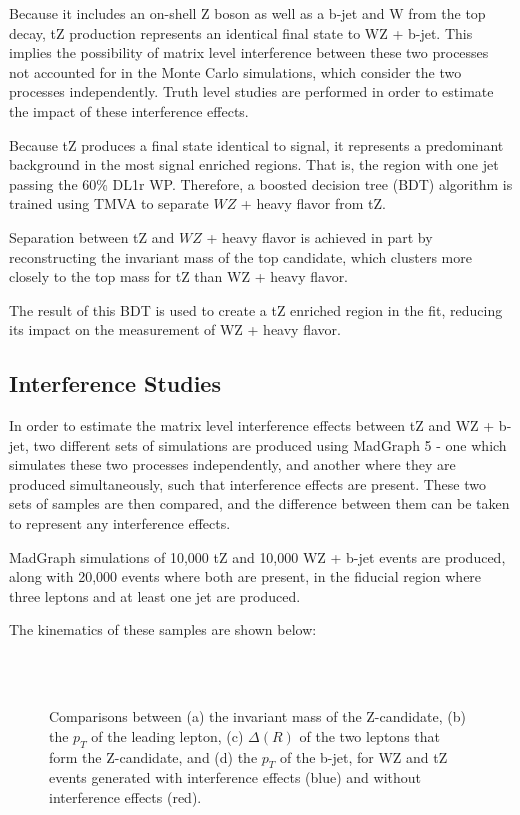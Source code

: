 
Because it includes an on-shell Z boson as well as a b-jet and W from the top decay, tZ production represents an identical final state  to WZ + b-jet. This implies the possibility of matrix level interference between these two processes not accounted for in the Monte Carlo simulations, which consider the two processes independently. Truth level studies are performed in order to estimate the impact of these interference effects.

Because tZ produces a final state identical to signal, it represents a predominant background in the most signal enriched regions. That is, the region with one jet passing the 60\% DL1r WP. Therefore, a boosted decision tree (BDT) algorithm is trained using TMVA \cite{TMVA_guide} to separate $WZ$ + heavy flavor from tZ.

Separation between tZ and $WZ$ + heavy flavor is achieved in part by reconstructing the invariant mass of the top candidate, which clusters more closely to the top mass for tZ than WZ + heavy flavor.

The result of this BDT is used to create a tZ enriched region in the fit, reducing its impact on the measurement of WZ + heavy flavor.

\subsection{Interference Studies}
\label{subsec:interference}

In order to estimate the matrix level interference effects between tZ and WZ + b-jet, two different sets of simulations are produced using MadGraph 5 \cite{Madgraph} - one which simulates these two processes independently, and another where they are produced simultaneously, such that interference effects are present. These two sets of samples are then compared, and the difference between them can be taken to represent any interference effects.

MadGraph simulations of 10,000 tZ and 10,000 WZ + b-jet events are produced, along with 20,000 events where both are present, in the fiducial region where three leptons and at least one jet are produced. 

The kinematics of these samples are shown below:

\begin{figure}[H]
    \\                        
    \\
    \caption{Comparisons between (a) the invariant mass of the Z-candidate, (b) the $p_T$ of the leading lepton, (c) $\Delta(R)$ of the two leptons that form the Z-candidate, and (d) the $p_T$ of the b-jet, for WZ and tZ events generated with interference effects (blue) and without interference effects (red).}
\end{figure}

